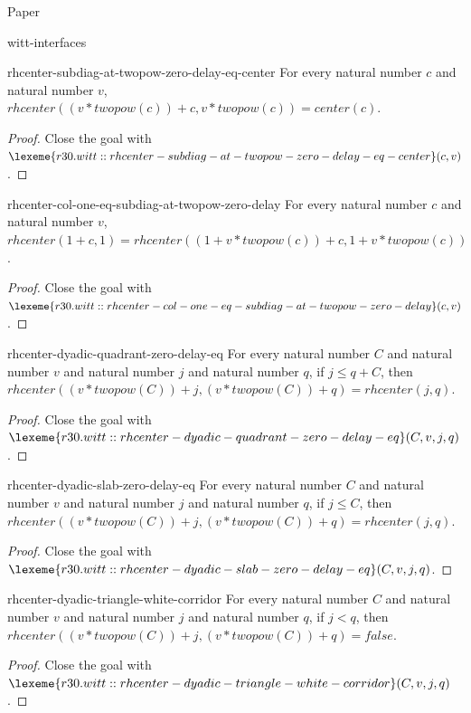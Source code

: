 \begin{lexlean}{Paper}
\begin{section}{witt-interfaces}
  \begin{theorem}{rhcenter-subdiag-at-twopow-zero-delay-eq-center}
  For every natural number \(c\) and natural number \(v\), \(rhcenter((v * twopow(c)) + c, v * twopow(c)) = center(c)\).
  \begin{proof}
  Close the goal with \(\lexeme{r30.witt::rhcenter-subdiag-at-twopow-zero-delay-eq-center}(c, v)\).
  \end{proof}
  \end{theorem}

  \begin{theorem}{rhcenter-col-one-eq-subdiag-at-twopow-zero-delay}
  For every natural number \(c\) and natural number \(v\), \(rhcenter(1 + c, 1) = rhcenter((1 + v * twopow(c)) + c, 1 + v * twopow(c))\).
  \begin{proof}
  Close the goal with \(\lexeme{r30.witt::rhcenter-col-one-eq-subdiag-at-twopow-zero-delay}(c, v)\).
  \end{proof}
  \end{theorem}

  \begin{theorem}{rhcenter-dyadic-quadrant-zero-delay-eq}
  For every natural number \(C\) and natural number \(v\) and natural number \(j\) and natural number \(q\), if \(j ≤ q + C\), then \(rhcenter((v * twopow(C)) + j, (v * twopow(C)) + q) = rhcenter(j, q)\).
  \begin{proof}
  Close the goal with \(\lexeme{r30.witt::rhcenter-dyadic-quadrant-zero-delay-eq}(C, v, j, q)\).
  \end{proof}
  \end{theorem}

  \begin{theorem}{rhcenter-dyadic-slab-zero-delay-eq}
  For every natural number \(C\) and natural number \(v\) and natural number \(j\) and natural number \(q\), if \(j ≤ C\), then \(rhcenter((v * twopow(C)) + j, (v * twopow(C)) + q) = rhcenter(j, q)\).
  \begin{proof}
  Close the goal with \(\lexeme{r30.witt::rhcenter-dyadic-slab-zero-delay-eq}(C, v, j, q)\).
  \end{proof}
  \end{theorem}

  \begin{theorem}{rhcenter-dyadic-triangle-white-corridor}
  For every natural number \(C\) and natural number \(v\) and natural number \(j\) and natural number \(q\), if \(j < q\), then \(rhcenter((v * twopow(C)) + j, (v * twopow(C)) + q) = false\).
  \begin{proof}
  Close the goal with \(\lexeme{r30.witt::rhcenter-dyadic-triangle-white-corridor}(C, v, j, q)\).
  \end{proof}
  \end{theorem}


\end{section}
\end{lexlean}
